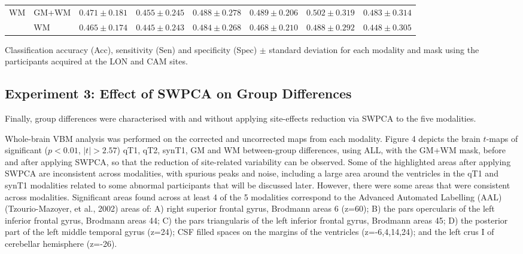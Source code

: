 \begin{bigtable}
\begin{tabularx}{\linewidth}{ll|XXX|XXX}
		\midrule
		\multirow{2}{*}{\ac{WM}} &GM+WM &		$ 0.471 \pm 0.181 $ & $ 0.455 \pm 0.245 $ & $ 0.488 \pm 0.278 $ & $ 0.489 \pm 0.206 $ & $ 0.502 \pm 0.319 $ &  $ 0.483 \pm 0.314 $ \\
		&		WM &		$ 0.465 \pm 0.174 $ & $ 0.445 \pm 0.243 $ & $ 0.484 \pm 0.268 $ & $ 0.468 \pm 0.210 $ & $ 0.488 \pm 0.292 $ &  $ 0.448 \pm 0.305 $ \\
		\bottomrule
	\end{tabularx}
	\caption[Classification accuracy (Acc), sensitivity (Sen) and specificity (Spec) $\pm$ standard deviation for each modality and mask using the participants acquired at the LON and CAM sites.]{Classification accuracy (Acc), sensitivity (Sen) and specificity (Spec) $\pm$ standard deviation for each modality and mask using the participants acquired at the LON and CAM sites.}
	\label{tab:swpcaLONCAM}
\end{bigtable}



\subsection{Experiment 3: Effect of SWPCA on Group Differences}\label{sec:swpcaE3}
Finally, group differences were characterised with and without applying
site-effects reduction via SWPCA to the five modalities. 

Whole-brain \ac{VBM} analysis was performed on the corrected and uncorrected
maps from each modality. Figure 4 depicts the brain $t$-maps
of significant ($p<0.01$, $|t|>2.57$) \ac{qT1}, \ac{qT2}, \ac{synT1}, \ac{GM} and \ac{WM} between-group differences, using ALL, with the GM+WM mask,
before and after applying \ac{SWPCA}, so that the reduction of site-related
variability can be observed. Some of the highlighted areas after
applying \ac{SWPCA} are inconsistent across modalities, with spurious peaks
and noise, including a large area around the ventricles in the \ac{qT1} and
\ac{synT1} modalities related to some abnormal participants that will be
discussed later. However, there were some areas that were consistent
across modalities. Significant areas found across at least 4 of the 5
modalities correspond to the Advanced Automated Labelling (AAL)
(Tzourio-Mazoyer, et al., 2002) areas of: A) right superior frontal
gyrus, Brodmann areas 6 (z=60); B) the pars opercularis of the left
inferior frontal gyrus, Brodmann areas 44; C) the pars triangularis of
the left inferior frontal gyrus, Brodmann areas 45; D) the posterior
part of the left middle temporal gyrus (z=24); CSF filled spaces on the
margins of the ventricles (z=-6,4,14,24); and the left crus I of
cerebellar hemisphere (z=-26).

